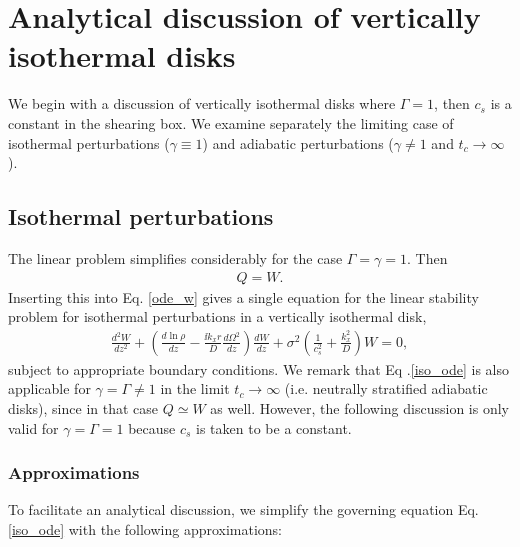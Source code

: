 \section{Analytical discussion of vertically isothermal disks} 
We begin with a discussion of vertically isothermal disks
where $\Gamma=1$, then $c_s$ is a constant in the shearing box. We
examine separately the limiting case of isothermal perturbations
($\gamma\equiv1$) and adiabatic perturbations ($\gamma\neq 1$ and
$t_c\to\infty$).   
\subsection{Isothermal perturbations}\label{iso_discuss}
The linear problem simplifies considerably for the case
$\Gamma=\gamma=1$. Then 
\begin{align}
  Q=W. 
\end{align}
Inserting this into Eq. \ref{ode_w} gives a single equation for the linear stability
problem for isothermal perturbations in a vertically isothermal disk, 
\begin{align}\label{iso_ode}
  \frac{d^2W}{dz^2} + \left(\frac{d\ln{\rho}}{dz} - \frac{\ii k_x
      r}{D}\frac{d\Omega^2}{dz}\right) \frac{dW}{dz} +
  \sigma^2\left(\frac{1}{c_s^2} + \frac{k_x^2}{D}\right)W=0, 
\end{align} 
subject to appropriate boundary conditions. We remark that Eq
.\ref{iso_ode} is also applicable for    
$\gamma=\Gamma\neq 1$ in the limit $t_c\to\infty$ (i.e. neutrally
stratified adiabatic disks), since in that case  
$Q\simeq W$ as well. However, the following discussion is only
valid for $\gamma=\Gamma=1$ because $c_s$ is taken to be a constant.   

\subsubsection{Approximations}
To facilitate an analytical discussion, we simplify the governing
equation Eq. \ref{iso_ode} with the following approximations:

